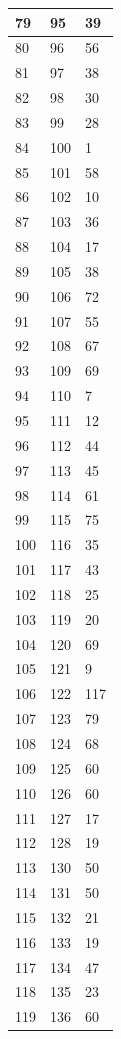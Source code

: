 \begin{tabular}{p{}p{}p{}}
\hline
79 & 95 & 39 \\
\hline
80 & 96 & 56 \\
\hline
81 & 97 & 38 \\
\hline
82 & 98 & 30 \\
\hline
83 & 99 & 28 \\
\hline
84 & 100 & 1 \\
\hline
85 & 101 & 58 \\
\hline
86 & 102 & 10 \\
\hline
87 & 103 & 36 \\
\hline
88 & 104 & 17 \\
\hline
89 & 105 & 38 \\
\hline
90 & 106 & 72 \\
\hline
91 & 107 & 55 \\
\hline
92 & 108 & 67 \\
\hline
93 & 109 & 69 \\
\hline
94 & 110 & 7 \\
\hline
95 & 111 & 12 \\
\hline
96 & 112 & 44 \\
\hline
97 & 113 & 45 \\
\hline
98 & 114 & 61 \\
\hline
99 & 115 & 75 \\
\hline
100 & 116 & 35 \\
\hline
101 & 117 & 43 \\
\hline
102 & 118 & 25 \\
\hline
103 & 119 & 20 \\
\hline
104 & 120 & 69 \\
\hline
105 & 121 & 9 \\
\hline
106 & 122 & 117 \\
\hline
107 & 123 & 79 \\
\hline
108 & 124 & 68 \\
\hline
109 & 125 & 60 \\
\hline
110 & 126 & 60 \\
\hline
111 & 127 & 17 \\
\hline
112 & 128 & 19 \\
\hline
113 & 130 & 50 \\
\hline
114 & 131 & 50 \\
\hline
115 & 132 & 21 \\
\hline
116 & 133 & 19 \\
\hline
117 & 134 & 47 \\
\hline
118 & 135 & 23 \\
\hline
119 & 136 & 60 \\

\end{tabular}
